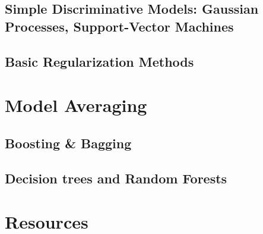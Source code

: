 \documentclass{beamer}
\begin{document}
    \subsection{Simple Discriminative Models: Gaussian Processes, Support-Vector Machines} 
    \subsection{Basic Regularization Methods}                                
\section{Model Averaging}
    \subsection{Boosting \& Bagging}                                         
    \subsection{Decision trees and Random Forests}                           
\section{Resources}                                                          
\end{document}
